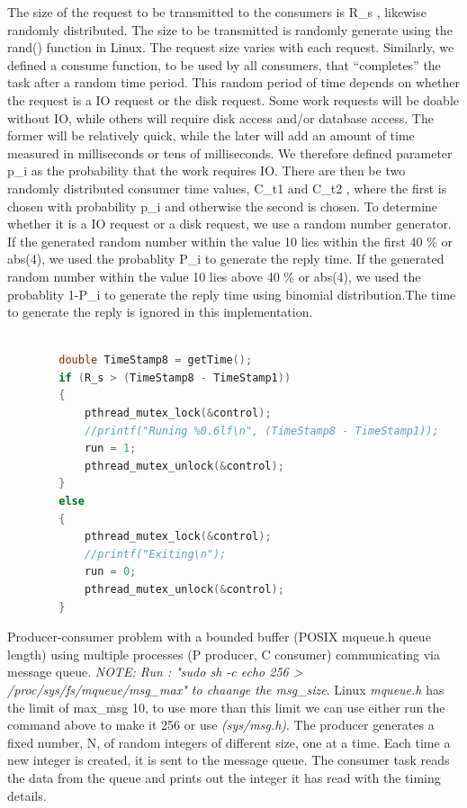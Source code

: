 \documentclass[10pt]{article}
\begin{document}
The size of the request to be transmitted to the consumers is R\_s , likewise randomly distributed. The size to be transmitted is randomly generate using the rand() function in Linux. The request size varies with each request. Similarly, we defined a consume function,
to be used by all consumers, that “completes” the task after a random time period. This random period of time depends on whether the request is a IO request or the disk request. Some work requests will be doable without IO, while others will require disk access and/or database access. The former will be relatively quick, while the later will add an amount of time measured in milliseconds or tens of milliseconds. We therefore
defined parameter p\_i as the probability that the work requires IO. There are then be two randomly distributed consumer time values, C\_t1 and C\_t2 , where the first is chosen with probability p\_i and otherwise the second is chosen. To determine whether it is a IO request or a disk request, we use a random number generator. If the generated random number within the value 10 lies within the first 40 \% or abs(4), we used the probablity P\_i to generate the reply time. If the generated random number within the value 10 lies above 40 \% or abs(4), we used the probablity 1-P\_i to generate the reply time using binomial distribution.The time to generate the reply is ignored in this implementation.
\begin{lstlisting}[language=C, caption= Signalling Thread to Stop]

		double TimeStamp8 = getTime();
		if (R_s > (TimeStamp8 - TimeStamp1))
		{
			pthread_mutex_lock(&control);
   	        //printf("Runing %0.6lf\n", (TimeStamp8 - TimeStamp1));
			run = 1;
			pthread_mutex_unlock(&control);
		}
		else
		{
			pthread_mutex_lock(&control);
   	        //printf("Exiting\n");
			run = 0;
			pthread_mutex_unlock(&control);
		}

\end{lstlisting}

Producer-consumer problem with a bounded buffer (POSIX mqueue.h queue length) using multiple processes (P producer, C consumer) communicating via message queue.
\textit{NOTE:  Run : "sudo sh -c echo 256 > /proc/sys/fs/mqueue/msg\_max" to chaange the msg\_size}.
Linux \textit{mqueue.h} has the limit of max\_msg 10, to use more than this limit we can use either run the command above to make it 256 or use \textit{(sys/msg.h)}. The producer generates a fixed number, N, of random integers of different size, one at a time. Each time a new integer is created, it is sent to the message queue. The consumer task reads the data from the queue and prints out the integer it has read with the timing details.
\end{document}
